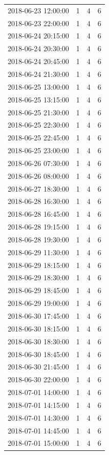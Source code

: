 \begin{tabular}{lrrr}
2018-06-23 12:00:00 & 1 & 4 & 6 \\
2018-06-23 22:00:00 & 1 & 4 & 6 \\
2018-06-24 20:15:00 & 1 & 4 & 6 \\
2018-06-24 20:30:00 & 1 & 4 & 6 \\
2018-06-24 20:45:00 & 1 & 4 & 6 \\
2018-06-24 21:30:00 & 1 & 4 & 6 \\
2018-06-25 13:00:00 & 1 & 4 & 6 \\
2018-06-25 13:15:00 & 1 & 4 & 6 \\
2018-06-25 21:30:00 & 1 & 4 & 6 \\
2018-06-25 22:30:00 & 1 & 4 & 6 \\
2018-06-25 22:45:00 & 1 & 4 & 6 \\
2018-06-25 23:00:00 & 1 & 4 & 6 \\
2018-06-26 07:30:00 & 1 & 4 & 6 \\
2018-06-26 08:00:00 & 1 & 4 & 6 \\
2018-06-27 18:30:00 & 1 & 4 & 6 \\
2018-06-28 16:30:00 & 1 & 4 & 6 \\
2018-06-28 16:45:00 & 1 & 4 & 6 \\
2018-06-28 19:15:00 & 1 & 4 & 6 \\
2018-06-28 19:30:00 & 1 & 4 & 6 \\
2018-06-29 11:30:00 & 1 & 4 & 6 \\
2018-06-29 18:15:00 & 1 & 4 & 6 \\
2018-06-29 18:30:00 & 1 & 4 & 6 \\
2018-06-29 18:45:00 & 1 & 4 & 6 \\
2018-06-29 19:00:00 & 1 & 4 & 6 \\
2018-06-30 17:45:00 & 1 & 4 & 6 \\
2018-06-30 18:15:00 & 1 & 4 & 6 \\
2018-06-30 18:30:00 & 1 & 4 & 6 \\
2018-06-30 18:45:00 & 1 & 4 & 6 \\
2018-06-30 21:45:00 & 1 & 4 & 6 \\
2018-06-30 22:00:00 & 1 & 4 & 6 \\
2018-07-01 14:00:00 & 1 & 4 & 6 \\
2018-07-01 14:15:00 & 1 & 4 & 6 \\
2018-07-01 14:30:00 & 1 & 4 & 6 \\
2018-07-01 14:45:00 & 1 & 4 & 6 \\
2018-07-01 15:00:00 & 1 & 4 & 6 \\

\end{tabular}
